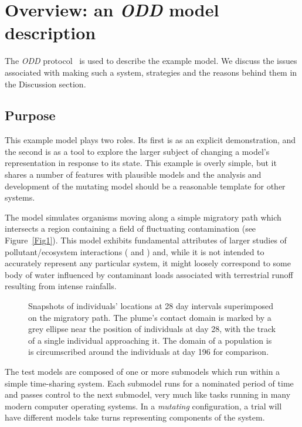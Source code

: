 \section{Overview: an {\em{ODD}\/} model description}\label{ODD}

The {\em{ODD}\/} protocol~\citep{Grimm06:1} is used to describe the example
model. We discuss the issues associated with making such a system, strategies
and the reasons behind them in the Discussion section.

\subsection{Purpose}

This example model plays two roles. Its first is as an explicit demonstration,
and the second is as a tool to explore the larger subject of changing a
model's representation in response to its state. This example is overly
simple, but it shares a number of features with plausible models and the
analysis and development of the mutating model should be a reasonable template
for other systems.

The model simulates organisms moving along a simple migratory path which
intersects a region containing a field of fluctuating contamination (see
Figure~\ref{Fig1}). This model exhibits fundamental attributes of larger
studies of pollutant/ecosystem interactions (\citeauthor{Lyne94:1} and
\citeauthor{gray2006nws}) and, while it is not intended to accurately represent any
particular system, it might loosely correspond to some body of water
influenced by contaminant loads associated with terrestrial runoff resulting
from intense rainfalls.

\begin{figure}[ht]
  \caption{Snapshots of individuals' locations at 28 day intervals
  superimposed on the migratory path. The plume's contact domain is marked by
  a grey ellipse near the position of individuals at day 28, with the track of
  a single individual approaching it. The domain of a population is is
  circumscribed around the individuals at day 196 for comparison.}
\end{figure}\label{Fig1}

The test models are composed of one or more submodels which run within a
simple time-sharing system. Each submodel runs for a nominated period of time
and passes control to the next submodel, very much like tasks running in many
modern computer operating systems. In a {\em{mutating}\/} configuration, a
trial will have different models take turns representing components of the
system.

